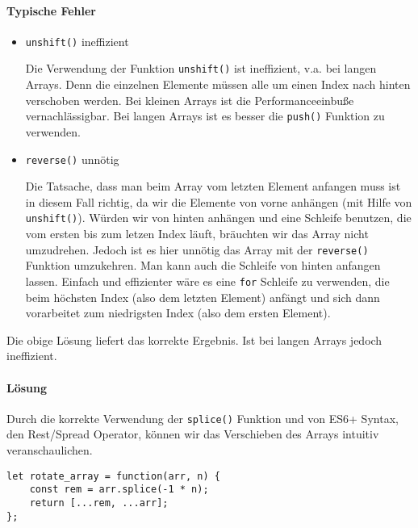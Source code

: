 \documentclass{book}
\begin{document}
\paragraph{Typische Fehler}
\begin{itemize} 
	\item \lstinline|unshift()| ineffizient
	
	Die Verwendung der Funktion \lstinline|unshift()| ist ineffizient, v.a. bei langen Arrays. Denn die einzelnen Elemente müssen alle um einen Index nach hinten verschoben werden. Bei kleinen Arrays ist die Performanceeinbuße vernachlässigbar. Bei langen Arrays ist es besser die \lstinline|push()| Funktion zu verwenden.
	
	\item \lstinline|reverse()| unnötig
	
	Die Tatsache, dass man beim Array vom letzten Element anfangen muss ist in diesem Fall richtig, da wir die Elemente von vorne anhängen (mit Hilfe von \lstinline|unshift()|). Würden wir von hinten anhängen und eine Schleife benutzen, die vom ersten bis zum letzen Index läuft, bräuchten wir das Array nicht umzudrehen. Jedoch ist es hier unnötig das Array mit der \lstinline|reverse()| Funktion umzukehren. Man kann auch die Schleife von hinten anfangen lassen. Einfach und effizienter wäre es eine \lstinline|for| Schleife zu verwenden, die beim höchsten Index (also dem letzten Element) anfängt und sich dann vorarbeitet zum niedrigsten Index (also dem ersten Element).
	
\end{itemize}

Die obige Lösung liefert das korrekte Ergebnis. Ist bei langen Arrays jedoch ineffizient.

\paragraph{Lösung} Durch die korrekte Verwendung der \lstinline|splice()| Funktion und von ES6+ Syntax, den Rest/Spread Operator, können wir das Verschieben des Arrays intuitiv veranschaulichen.

\begin{lstlisting}[caption=My Javascript Example]
let rotate_array = function(arr, n) {
	const rem = arr.splice(-1 * n);
	return [...rem, ...arr];
};
\end{lstlisting}
\end{document}
